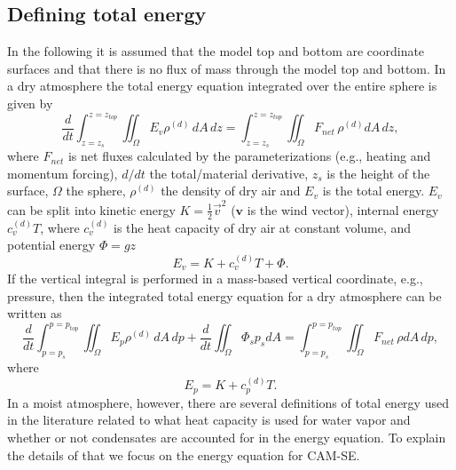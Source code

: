 \documentclass{agujournal}
\begin{document}
\subsection{Defining total energy}
In the following it is assumed that the model top and bottom are coordinate surfaces and that there is no flux of mass through the model top and bottom. In a dry atmosphere the total energy equation integrated over the entire sphere is given by
\begin{equation}
\frac{d}{dt}\int_{z=z_s}^{z=z_{top}}\iint_{\Omega} E_v \rho^{(d)}\, dA\, dz=\int_{z=z_s}^{z=z_{top}}\iint_{\Omega} F_{net}\, \rho^{(d)} dA\, dz,
\end{equation}
\citep[e.g., ][]{K1974MWR} where $F_{net}$ is net fluxes calculated by the parameterizations (e.g., heating and momentum forcing), $d/dt$ the total/material derivative, $z_s$ is the height of the surface, $\Omega$ the sphere, $\rho^{(d)}$ the density of dry air and $E_v$ is the total energy. $E_v$ can be split into kinetic energy $K=\frac{1}{2}\vec{v}^2$ ($\mathbf{v}$ is the wind vector), internal energy $c_v^{(d)}T$, where $c_v^{(d)}$ is the heat capacity of dry air at constant volume, and potential energy $\Phi=gz$
\begin{equation}
E_v=K+c_v^{(d)}T+\Phi.
\end{equation}
If the vertical integral is performed in a mass-based vertical coordinate, e.g., pressure, then the integrated total energy equation for a dry atmosphere can be written as
\begin{equation}
\frac{d}{dt}\int_{p=p_s}^{p=p_{top}}\iint_{\Omega} E_p \rho^{(d)}\, dA\, dp + \frac{d}{dt}\iint_{\Omega}\Phi_sp_s dA =\int_{p=p_s}^{p=p_{top}}\iint_{\Omega} F_{net}\, \rho dA\, dp,
\end{equation}
\citep[e.g., ][]{K1974MWR} where
\begin{equation}
E_p=K+c_p^{(d)}T.
\end{equation}
In a moist atmosphere, however, there are several definitions of total energy used in the literature related to what heat capacity is used for water vapor and whether or not condensates are accounted for in the energy equation. To explain the details of that we focus on the energy equation for CAM-SE.
\end{document}
